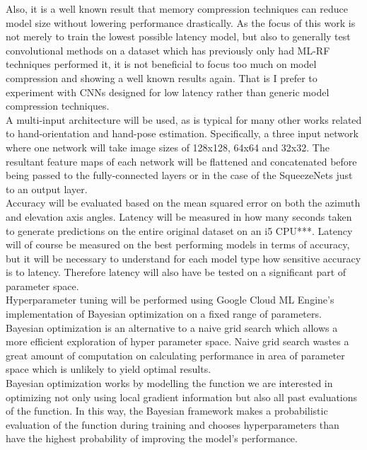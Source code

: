 \documentclass{article}
\begin{document}
Also, it is a well known result that memory compression techniques can reduce model size without lowering performance drastically. As the focus of this work is not merely to train the lowest possible latency model, but also to generally test convolutional methods on a dataset which has previously only had ML-RF techniques performed it, it is not beneficial to focus too much on model compression and showing a well known results again. That is I prefer to experiment with CNNs designed for low latency rather than generic model compression techniques.\\

A multi-input architecture will be used, as is typical for many other works related to hand-orientation and hand-pose estimation. Specifically, a three input network where one network will take image sizes of 128x128, 64x64 and 32x32. The resultant feature maps of each network will be flattened and concatenated before being passed to the fully-connected layers or in the case of the SqueezeNets just to an output layer.\\

Accuracy will be evaluated based on the mean squared error on both the azimuth and elevation axis angles. Latency will be measured in how many seconds taken to generate predictions on the entire original dataset on an i5 CPU***. Latency will of course be measured on the best performing models in terms of accuracy, but it will be necessary to understand for each model type how sensitive accuracy is to latency. Therefore latency will also have be tested on a significant part of parameter space.\\

Hyperparameter tuning will be performed using Google Cloud ML Engine's implementation of Bayesian optimization on a fixed range of parameters. Bayesian optimization is an alternative to a naive grid search which allows a more efficient exploration of hyper parameter space. Naive grid search wastes a great amount of computation on calculating performance in area of parameter space which is unlikely to yield optimal results.\\

Bayesian optimization works by modelling the function we are interested in optimizing not only using local gradient information but also all past evaluations of the function. In this way, the Bayesian framework makes a probabilistic evaluation of the function during training and chooses hyperparameters than have the highest probability of improving the model's performance.\\
\end{document}
